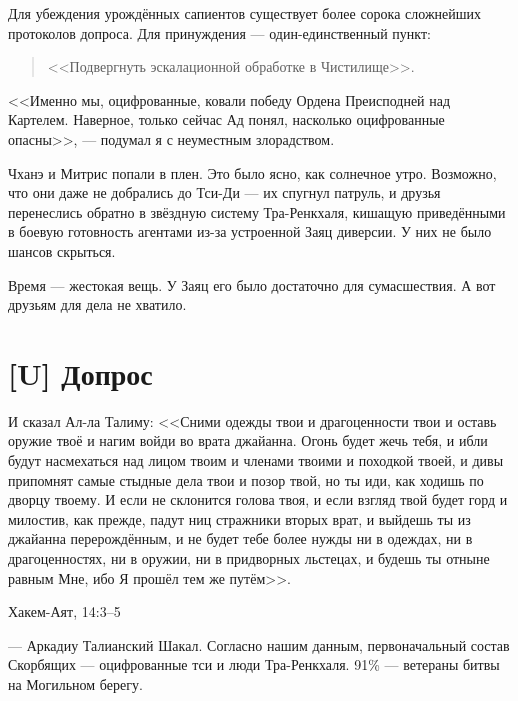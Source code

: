 Для убеждения урождённых сапиентов существует более сорока сложнейших протоколов допроса.
Для принуждения --- один-единственный пункт:

\begin{quote}
<<Подвергнуть эскалационной обработке в Чистилище>>.
\end{quote}

<<Именно мы, оцифрованные, ковали победу Ордена Преисподней над Картелем.
Наверное, только сейчас Ад понял, насколько оцифрованные опасны>>, --- подумал я с неуместным злорадством.

Чханэ и Митрис попали в плен.
Это было ясно, как солнечное утро.
Возможно, что они даже не добрались до Тси-Ди --- их спугнул патруль, и друзья перенеслись обратно в звёздную систему Тра-Ренкхаля, кишащую приведёнными в боевую готовность агентами из-за устроенной Заяц диверсии.
У них не было шансов скрыться.

Время --- жестокая вещь.
У Заяц его было достаточно для сумасшествия.
А вот друзьям для дела не хватило.

\section{[U] Допрос}

\epigraph{И сказал Ал-ла Талиму: <<Сними одежды твои и драгоценности твои и оставь оружие твоё и нагим войди во врата джайанна\FM.
Огонь будет жечь тебя, и ибли\FM{} будут насмехаться над лицом твоим и членами твоими и походкой твоей, и дивы\FM{} припомнят самые стыдные дела твои и позор твой, но ты иди, как ходишь по дворцу твоему.
И если не склонится голова твоя, и если взгляд твой будет горд и милостив, как прежде, падут ниц стражники вторых врат, и выйдешь ты из джайанна перерождённым, и не будет тебе более нужды ни в одеждах, ни в драгоценностях, ни в оружии, ни в придворных льстецах, и будешь ты отныне равным Мне, ибо Я прошёл тем же путём>>.}
{Хакем-Аят, 14:3--5}

\textspace

--- Аркадиу Талианский Шакал.
Согласно нашим данным, первоначальный состав Скорбящих --- оцифрованные тси и люди Тра-Ренкхаля.
91\% --- ветераны битвы на Могильном берегу.

